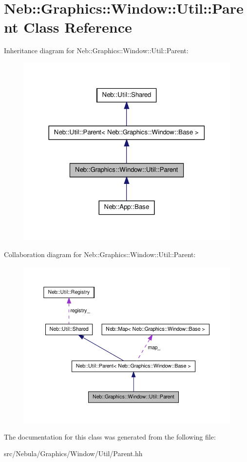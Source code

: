 \hypertarget{classNeb_1_1Graphics_1_1Window_1_1Util_1_1Parent}{\section{\-Neb\-:\-:\-Graphics\-:\-:\-Window\-:\-:\-Util\-:\-:\-Parent \-Class \-Reference}
\label{classNeb_1_1Graphics_1_1Window_1_1Util_1_1Parent}
}


\-Inheritance diagram for \-Neb\-:\-:\-Graphics\-:\-:\-Window\-:\-:\-Util\-:\-:\-Parent\-:\nopagebreak
\begin{figure}[H]
\begin{center}
\leavevmode
\includegraphics[width=320pt]{classNeb_1_1Graphics_1_1Window_1_1Util_1_1Parent__inherit__graph}
\end{center}
\end{figure}


\-Collaboration diagram for \-Neb\-:\-:\-Graphics\-:\-:\-Window\-:\-:\-Util\-:\-:\-Parent\-:\nopagebreak
\begin{figure}[H]
\begin{center}
\leavevmode
\includegraphics[width=350pt]{classNeb_1_1Graphics_1_1Window_1_1Util_1_1Parent__coll__graph}
\end{center}
\end{figure}


\-The documentation for this class was generated from the following file\-:\begin{DoxyCompactItemize}
\item 
src/\-Nebula/\-Graphics/\-Window/\-Util/\-Parent.\-hh\end{DoxyCompactItemize}
